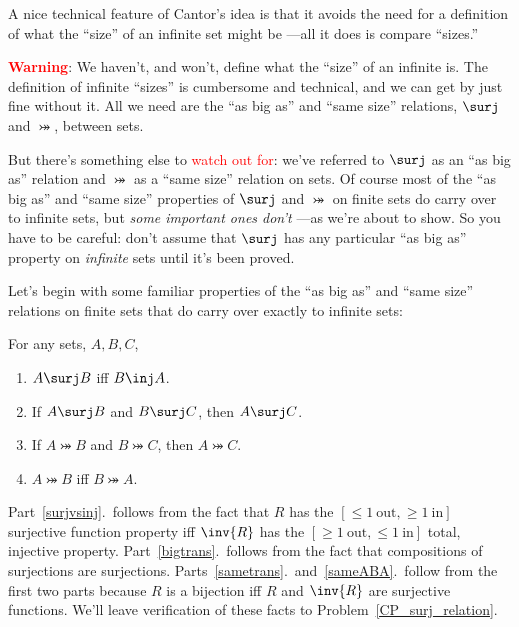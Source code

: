 A nice technical feature of Cantor's idea is that it avoids the need
for a definition of what the ``size'' of an infinite set might
be ---all it does is compare ``sizes.''

\textcolor{red}{\textbf{Warning}}: We haven't, and won't, define what the
``size'' of an infinite is.  The definition of infinite ``sizes'' is
cumbersome and technical, and we can get by just fine without it.  All we
need are the ``as big as'' and ``same size'' relations, $\surj$ and
$\bij$, between sets.

But there's something else to \textcolor{red}{watch out for}: we've
referred to $\surj$ as an ``as big as'' relation and $\bij$ as a
``same size'' relation on sets.  Of course most of the ``as big as''
and ``same size'' properties of $\surj$ and $\bij$ on finite sets do
carry over to infinite sets, but \emph{some important ones don't} ---as
we're about to show.  So you have to be careful: don't assume that
$\surj$ has any particular ``as big as'' property on \emph{infinite}
sets until it's been proved.

Let's begin with some familiar properties of the ``as big as'' and ``same
size'' relations on finite sets that do carry over exactly to infinite
sets:
\begin{lemma}\label{translem}
For any sets, $A,B,C$,
\begin{enumerate}

\item \label{surjvsinj} $A \surj B$ iff $B \inj A$.

\item \label{bigtrans} If $A \surj B$ and $B \surj C$, then $A \surj C$.

\item \label{sametrans} If $A \bij B$ and $B \bij C$, then $A \bij C$.

\item\label{sameABA} $A \bij B$ iff $B \bij A$.
\end{enumerate}
\end{lemma}

Part~\ref{surjvsinj}.\ follows from the fact that $R$ has the $[\le 1\
\text{out}, \ge 1\ \text{in}]$ surjective function property iff $\inv{R}$
has the $[\ge 1\ \text{out}, \le 1\ \text{in}]$ total, injective property.
Part~\ref{bigtrans}.\ follows from the fact that compositions of
surjections are surjections.  Parts~\ref{sametrans}.\ and~\ref{sameABA}.\
follow from the first two parts because $R$ is a bijection iff $R$ and
$\inv{R}$ are surjective functions.  We'll leave verification of these
facts to Problem~\ref{CP_surj_relation}.

